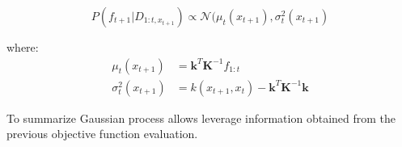 \begin{equation}
    P(f_{t+1}|D_{1:t, x_{t+1}}) \propto \mathcal{N} (\mu_{t}(x_{t+1}), \sigma_{t}^{2}(x_{t+1}) 
\end{equation}

where: 
\begin{equation*}
\begin{aligned}
    \mu_{t}(x_{t+1}) &= \mathbf{k}^{T}\mathbf{K}^{-1}f_{1:t} \\
     \sigma_{t}^{2}(x_{t+1}) &= k(x_{t+1},x_t) - \mathbf{k}^{T}\mathbf{K}^{-1}\mathbf{k}
     \end{aligned}
\end{equation*}

To summarize Gaussian process allows leverage information obtained from the previous objective function evaluation.


